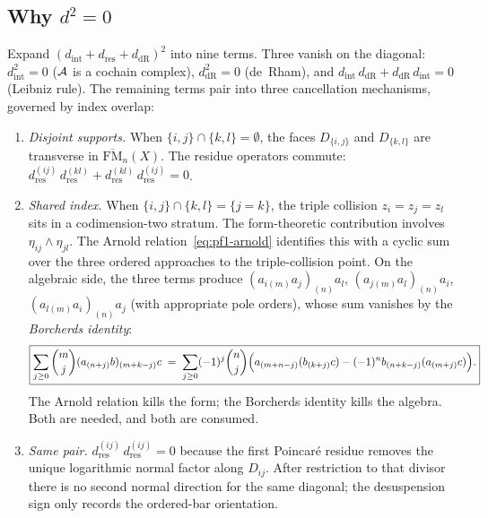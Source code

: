 \subsection*{Why $d^2 = 0$}

Expand $(d_{\mathrm{int}}+d_{\mathrm{res}}+d_{\mathrm{dR}})^2$
into nine terms. Three vanish on the diagonal:
$d_{\mathrm{int}}^2 = 0$ ($\mathcal{A}$ is a cochain complex),
$d_{\mathrm{dR}}^2 = 0$ (de~Rham), and
$d_{\mathrm{int}}\,d_{\mathrm{dR}}
+ d_{\mathrm{dR}}\,d_{\mathrm{int}} = 0$
(Leibniz rule).
The remaining terms pair into three cancellation mechanisms,
governed by index overlap:

\begin{enumerate}[label=(\alph*)]
\item \emph{Disjoint supports.}\;
When $\{i,j\}\cap\{k,l\}=\emptyset$, the faces
$D_{\{i,j\}}$ and $D_{\{k,l\}}$ are transverse in
$\overline{\mathrm{FM}}_n(X)$. The residue operators commute:
$d_{\mathrm{res}}^{(ij)}\,d_{\mathrm{res}}^{(kl)}
+ d_{\mathrm{res}}^{(kl)}\,d_{\mathrm{res}}^{(ij)} = 0$.

\item \emph{Shared index.}\;
When $\{i,j\}\cap\{k,l\} = \{j=k\}$, the triple collision
$z_i = z_j = z_l$ sits in a codimension-two stratum. The
form-theoretic contribution involves
$\eta_{ij}\wedge\eta_{jl}$. The Arnold
relation~\eqref{eq:pf1-arnold} identifies this with a cyclic
sum over the three ordered approaches to the triple-collision
point. On the algebraic side, the three terms produce
$(a_{i(m)}a_j)_{(n)}a_l$,\; $(a_{j(m)}a_l)_{(n)}a_i$,\;
$(a_{l(m)}a_i)_{(n)}a_j$ (with appropriate pole orders),
whose sum vanishes by the \emph{Borcherds identity}:
\begin{equation}\label{eq:pf1-borcherds}
\boxed{
\sum_{j\ge 0}\binom{m}{j}(a_{(n+j)}b)_{(m+k-j)}c
\;=\;
\sum_{j\ge 0}(-1)^j\binom{n}{j}
\Bigl(
a_{(m+n-j)}(b_{(k+j)}c)
-(-1)^n b_{(n+k-j)}(a_{(m+j)}c)
\Bigr).
}
\end{equation}
The Arnold relation kills the form; the Borcherds identity
kills the algebra. Both are needed, and both are consumed.

\item \emph{Same pair.}\;
$d_{\mathrm{res}}^{(ij)}\,d_{\mathrm{res}}^{(ij)} = 0$ because the
first Poincar\'e residue removes the unique logarithmic normal factor
along \(D_{ij}\).  After restriction to that divisor there is no second
normal direction for the same diagonal; the desuspension sign only
records the ordered-bar orientation.
\end{enumerate}

